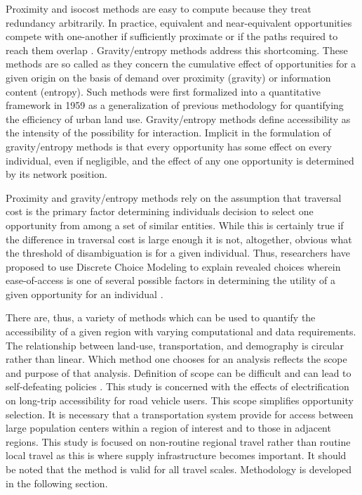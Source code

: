 \documentclass[11pt]{article}
\begin{document}
\begin{multicols}{2}
Proximity and isocost methods are easy to compute because they treat redundancy arbitrarily. In practice, equivalent and near-equivalent opportunities compete with one-another if sufficiently proximate or if the paths required to reach them overlap \cite{Stouffer_1940}. Gravity/entropy methods \cite{Noulas_2012, Jung_2008} address this shortcoming. These methods are so called as they concern the cumulative effect of opportunities for a given origin on the basis of demand over proximity (gravity) or information content (entropy). Such methods were first formalized into a quantitative framework in 1959 \cite{Hansen_1959} as a generalization of previous methodology for quantifying the efficiency of urban land use. Gravity/entropy methods define accessibility as the intensity of the possibility for interaction. Implicit in the formulation of gravity/entropy methods is that every opportunity has some effect on every individual, even if negligible, and the effect of any one opportunity is determined by its network position.

Proximity and gravity/entropy methods rely on the assumption that traversal cost is the primary factor determining individuals decision to select one opportunity from among a set of similar entities. While this is certainly true if the difference in traversal cost is large enough it is not, altogether, obvious what the threshold of disambiguation is for a given individual. Thus, researchers have proposed to use Discrete Choice Modeling \cite{Ben_Akiva_1985} to explain revealed choices wherein ease-of-access is one of several possible factors in determining the utility of a given opportunity for an individual \cite{Cevero_1995, Shen_1998, Karst_2003}.

There are, thus, a variety of methods which can be used to quantify the accessibility of a given region with varying computational and data requirements. The relationship between land-use, transportation, and demography is circular rather than linear. Which method one chooses for an analysis reflects the scope and purpose of that analysis. Definition of scope can be difficult and can lead to self-defeating policies \cite{Handy_1996}. This study is concerned with the effects of electrification on long-trip accessibility for road vehicle users. This scope simplifies opportunity selection. It is necessary that a transportation system provide for access between large population centers within a region of interest and to those in adjacent regions.  This study is focused on non-routine regional travel rather than routine local travel as this is where supply infrastructure becomes important. It should be noted that the method is valid for all travel scales. Methodology is developed in the following section.


\end{multicols}
\end{document}
